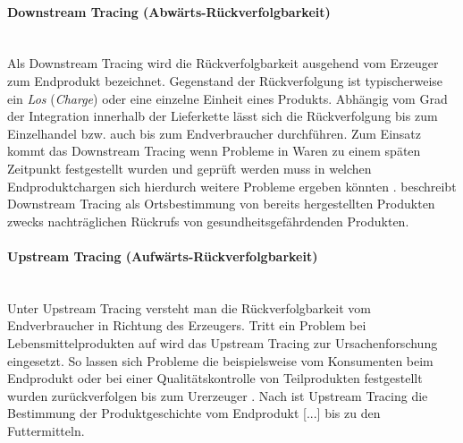 \paragraph{Downstream Tracing (Abwärts-Rückverfolgbarkeit)}$~~$\\
Als Downstream Tracing wird die Rückverfolgbarkeit ausgehend vom Erzeuger zum Endprodukt bezeichnet. Gegenstand der Rückverfolgung ist typischerweise ein \textit{Los} (\textit{Charge}) oder eine einzelne Einheit eines Produkts. Abhängig vom Grad der Integration innerhalb der Lieferkette lässt sich die Rückverfolgung bis zum Einzelhandel bzw. auch bis zum Endverbraucher durchführen. Zum Einsatz kommt das Downstream Tracing wenn Probleme in Waren zu einem späten Zeitpunkt festgestellt wurden und geprüft werden muss in welchen Endproduktchargen sich hierdurch weitere Probleme ergeben könnten \citep{Trienekens2001, Zailani2010}. \citet{Wegner-Hambloch2004} beschreibt Downstream Tracing als \glqq Ortsbestimmung von bereits hergestellten Produkten zwecks nachträglichen Rückrufs von gesundheitsgefährdenden Produkten\grqq{}.

\paragraph{Upstream Tracing (Aufwärts-Rückverfolgbarkeit)}$~~$\\
Unter Upstream Tracing versteht man die Rückverfolgbarkeit vom Endverbraucher in Richtung des Erzeugers. Tritt ein Problem bei Lebensmittelprodukten auf wird das Upstream Tracing zur Ursachenforschung eingesetzt. So lassen sich Probleme die beispielsweise vom Konsumenten beim Endprodukt oder bei einer Qualitätskontrolle von Teilprodukten festgestellt wurden zurückverfolgen bis zum Urerzeuger \citep{Trienekens2001, Zailani2010}. Nach \citet{Wegner-Hambloch2004} ist Upstream Tracing \glqq die Bestimmung der Produktgeschichte vom Endprodukt [...] bis zu den Futtermitteln.\grqq{}

